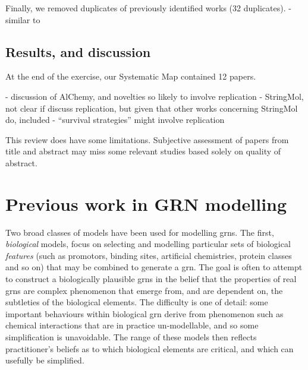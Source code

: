 Finally, we removed duplicates of previously identified works (32 duplicates).
\eg \cite{smFaulconbridgeStepneyMillerEtAl2011} - similar to \cite{Faulconbridge2011, Faulconbridge2010}

\section{Results, and discussion}

At the end of the exercise, our Systematic Map contained 12 papers.

\cite{smAdamsLipson2003}
\cite{smBobrikKvasnickaPospichal2008a}
\cite{smBobrikKvasnickaPospichal2008}
\cite{smEllabaan2007}
\cite{smSugiuraSuzukiShioseEtAl2003}
\cite{smFenizioMatsumaruDittrich2011} - discussion of AlChemy, and novelties so likely to involve replication
\cite{smHickinbothamClarkNellisEtAl2016} - StringMol, not clear if discuss replication, but given that other works concerning StringMol do, included
\cite{smHinzeFaslerLenserEtAl2009}
\cite{smSuzuki2003a}
\cite{smBanzhafDittrichEller1999} - ``survival strategies'' might involve replication
\cite{smGordon-Smith2011}
\cite{smGohEweGoh2014}


This review does have some limitations. Subjective assessment of papers from title and abstract may miss some relevant studies based solely on quality of abstract.

\chapter{Previous work in GRN modelling}\label{previous-work-in-grn-modelling}

Two broad classes of models have been used for modelling \glspl{grn}. The first, \emph{biological} models, focus on selecting and modelling particular sets of biological \emph{features} (such as promotors, binding sites, artificial chemistries, protein classes and so on) that may be combined to generate a \gls{grn}. The goal is often to attempt to construct a biologically plausible \glspl{grn} in the belief that the properties of real \glspl{grn} are complex phenomenon that emerge from, and are dependent on, the subtleties of the biological elements. The difficulty is one of detail: some important behaviours within biological \gls{grn} derive from phenomenon such as chemical interactions that are in practice un-modellable, and so some simplification is unavoidable. The range of these models then reflects practitioner's beliefs as to which biological elements are critical, and which can usefully be simplified.

